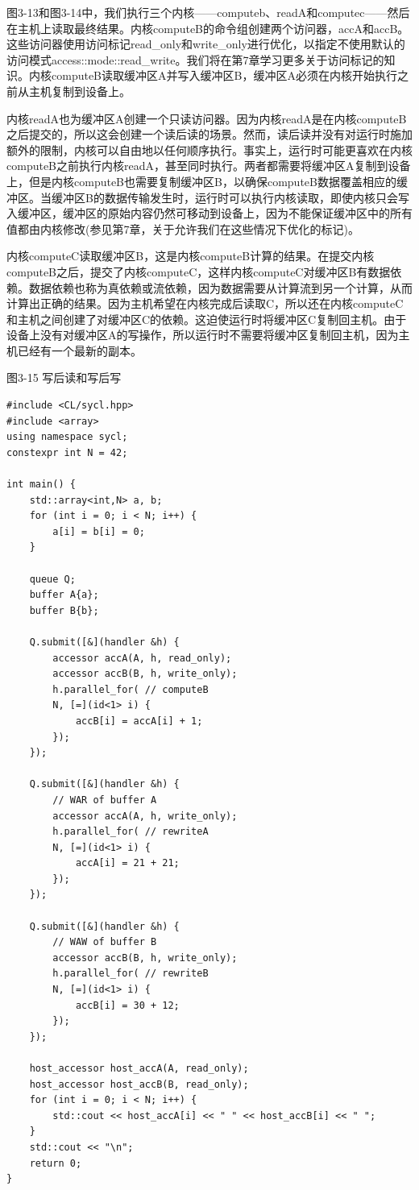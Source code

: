 图3-13和图3-14中，我们执行三个内核——computeb、readA和computec——然后在主机上读取最终结果。内核computeB的命令组创建两个访问器，accA和accB。这些访问器使用访问标记read\_only和write\_only进行优化，以指定不使用默认的访问模式access::mode::read\_write。我们将在第7章学习更多关于访问标记的知识。内核computeB读取缓冲区A并写入缓冲区B，缓冲区A必须在内核开始执行之前从主机复制到设备上。\par

内核readA也为缓冲区A创建一个只读访问器。因为内核readA是在内核computeB之后提交的，所以这会创建一个读后读的场景。然而，读后读并没有对运行时施加额外的限制，内核可以自由地以任何顺序执行。事实上，运行时可能更喜欢在内核computeB之前执行内核readA，甚至同时执行。两者都需要将缓冲区A复制到设备上，但是内核computeB也需要复制缓冲区B，以确保computeB数据覆盖相应的缓冲区。当缓冲区B的数据传输发生时，运行时可以执行内核读取，即使内核只会写入缓冲区，缓冲区的原始内容仍然可移动到设备上，因为不能保证缓冲区中的所有值都由内核修改(参见第7章，关于允许我们在这些情况下优化的标记)。\par

内核computeC读取缓冲区B，这是内核computeB计算的结果。在提交内核computeB之后，提交了内核computeC，这样内核computeC对缓冲区B有数据依赖。数据依赖也称为真依赖或流依赖，因为数据需要从计算流到另一个计算，从而计算出正确的结果。因为主机希望在内核完成后读取C，所以还在内核computeC和主机之间创建了对缓冲区C的依赖。这迫使运行时将缓冲区C复制回主机。由于设备上没有对缓冲区A的写操作，所以运行时不需要将缓冲区复制回主机，因为主机已经有一个最新的副本。\par

\hspace*{\fill} \par %
图3-15 写后读和写后写
\begin{lstlisting}[caption={}]
#include <CL/sycl.hpp>
#include <array>
using namespace sycl;
constexpr int N = 42;

int main() {
	std::array<int,N> a, b;
	for (int i = 0; i < N; i++) {
		a[i] = b[i] = 0;
	}

	queue Q;
	buffer A{a};
	buffer B{b};
	
	Q.submit([&](handler &h) {
		accessor accA(A, h, read_only);
		accessor accB(B, h, write_only);
		h.parallel_for( // computeB
		N, [=](id<1> i) {
			accB[i] = accA[i] + 1;
		});
	});

	Q.submit([&](handler &h) {
		// WAR of buffer A
		accessor accA(A, h, write_only);
		h.parallel_for( // rewriteA
		N, [=](id<1> i) {
			accA[i] = 21 + 21;
		});
	});

	Q.submit([&](handler &h) {
		// WAW of buffer B
		accessor accB(B, h, write_only);
		h.parallel_for( // rewriteB
		N, [=](id<1> i) {
			accB[i] = 30 + 12;
		});
	});

	host_accessor host_accA(A, read_only);
	host_accessor host_accB(B, read_only);
	for (int i = 0; i < N; i++) {
		std::cout << host_accA[i] << " " << host_accB[i] << " ";
	}
	std::cout << "\n";
	return 0;
}
\end{lstlisting}

